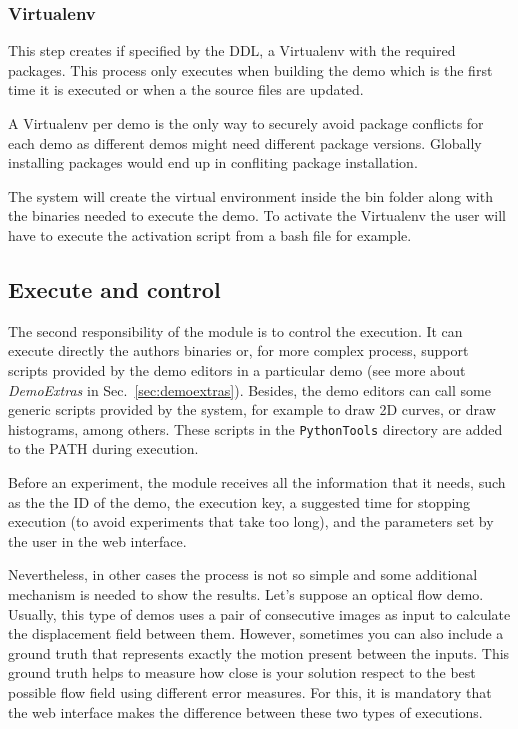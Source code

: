 \subsubsection{Virtualenv}
\noindent

This step creates if specified by the DDL, a Virtualenv with the required packages. This process only executes when building the demo which is the first time it is executed or when a the source files are updated.

A Virtualenv per demo is the only way to securely avoid package conflicts for each demo as different demos might need different package versions. Globally installing packages would end up in confliting package installation.

The system will create the virtual environment inside the bin folder along with the binaries needed to execute the demo. To activate the Virtualenv the user will have to execute the activation script from a bash file for example.


\subsection{Execute and control}
\noindent

The second responsibility of the module is to control the execution.  It can execute directly the authors binaries or, for more complex process, support scripts provided by the demo editors in a particular demo (see more about \textit{DemoExtras} in Sec.~\ref{sec:demoextras}). Besides, the demo editors can call some generic scripts provided by the system, for example to draw 2D curves, or draw histograms, among others. These scripts in the {\tt PythonTools} directory are added to the PATH during execution.

Before an experiment, the module receives all the information that it needs, such as the the ID of the demo, the execution key, a suggested time for stopping execution (to avoid experiments that take too long), and the parameters set by the user in the web interface.

Nevertheless, in other cases the process is not so simple and some additional mechanism is needed to show the results.  Let's suppose an optical flow demo. Usually, this type of demos uses a pair of consecutive images as input to calculate the displacement field between them. However, sometimes you can also include a ground truth that represents exactly the motion present between the inputs. This ground truth helps to measure how close is your solution respect to the best possible flow field using different error measures. For this, it is mandatory that the web interface makes the difference between these two types of executions. 


